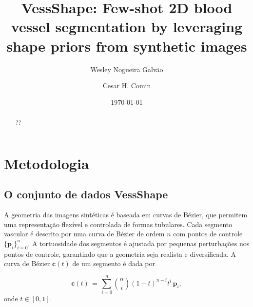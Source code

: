 \documentclass[%
reprint,
nofootinbib,
 amsmath,amssymb,
aps,
superscriptaddress,
showkeys,
longbibliography
]{revtex4-1}
\begin{document}



\title{VessShape: Few-shot 2D blood vessel segmentation by leveraging shape priors from synthetic images}

\author{Wesley Nogueira Galvão}


\author{Cesar H. Comin}

\date{\today}%

\begin{abstract}

??

\end{abstract}


\maketitle
\thispagestyle{plain}
\section{Metodologia}
\label{s:methodology}

\subsection{O conjunto de dados VessShape}

A geometria das imagens sintéticas é baseada em curvas de Bézier, que permitem uma representação flexível e controlada de formas tubulares. Cada segmento vascular é descrito por uma curva de Bézier de ordem $n$ com pontos de controle $\{\mathbf{p}_i\}_{i=0}^n$. A tortuosidade dos segmentos é ajustada por pequenas perturbações nos pontos de controle, garantindo que a geometria seja realista e diversificada. A curva de Bézier $\mathbf{c}(t)$ de um segmento é dada por

\begin{equation}
\mathbf{c}(t) \,=\, \sum_{i=0}^{n} \binom{n}{i} (1-t)^{n-i} t^{i} \, \mathbf{p}_i,
\label{eq:bezier}
\end{equation}
onde $t \in [0,1]$.
\end{document}
